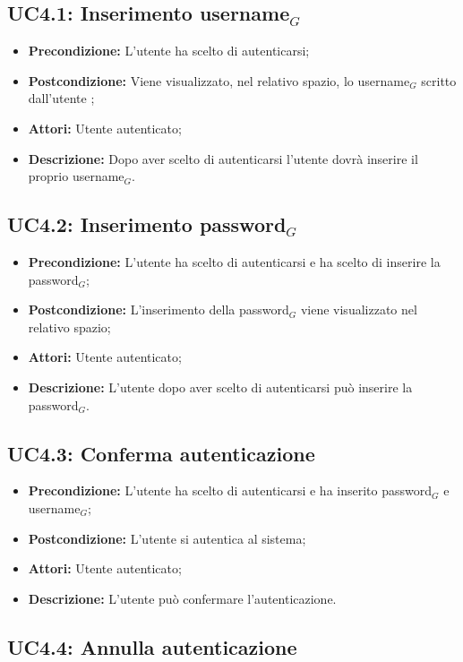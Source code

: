 \subsection{ UC4.1: Inserimento username$_G$}

\begin{itemize}
	\item \textbf{Precondizione:} L'utente ha scelto di autenticarsi;
	\item \textbf{Postcondizione:} Viene visualizzato, nel relativo spazio, lo username$_G$ scritto dall'utente ;
	\item \textbf{Attori:} Utente autenticato;
	\item \textbf{Descrizione:} Dopo aver scelto di autenticarsi l'utente dovrà inserire il proprio username$_G$.
\end{itemize}
\subsection{ UC4.2: Inserimento password$_G$}

\begin{itemize}
	\item \textbf{Precondizione:} L'utente ha scelto di autenticarsi e ha scelto di inserire la password$_G$;
	\item \textbf{Postcondizione:} L'inserimento della password$_G$ viene visualizzato nel relativo spazio;
	\item \textbf{Attori:} Utente autenticato;
	\item \textbf{Descrizione:} L'utente dopo aver scelto di autenticarsi può inserire la password$_G$.
\end{itemize}
\subsection{ UC4.3: Conferma autenticazione}

\begin{itemize}
	\item \textbf{Precondizione:} L'utente ha scelto di autenticarsi e ha inserito password$_G$ e username$_G$;
	\item \textbf{Postcondizione:} L'utente si autentica al sistema;
	\item \textbf{Attori:} Utente autenticato;
	\item \textbf{Descrizione:} L'utente può confermare l'autenticazione.
\end{itemize}
\subsection{ UC4.4: Annulla autenticazione}

